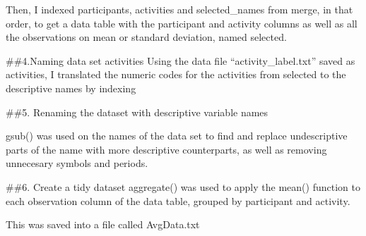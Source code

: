 \documentclass[
]{article}
\begin{document}
Then, I indexed participants, activities and selected\_names from merge,
in that order, to get a data table with the participant and activity
columns as well as all the observations on mean or standard deviation,
named selected.

\#\#4.Naming data set activities Using the data file
``activity\_label.txt'' saved as activities, I translated the numeric
codes for the activities from selected to the descriptive names by
indexing

\#\#5. Renaming the dataset with descriptive variable names

gsub() was used on the names of the data set to find and replace
undescriptive parts of the name with more descriptive counterparts, as
well as removing unnecesary symbols and periods.

\#\#6. Create a tidy dataset aggregate() was used to apply the mean()
function to each observation column of the data table, grouped by
participant and activity.

This was saved into a file called AvgData.txt
\end{document}
